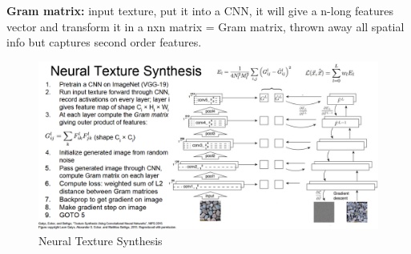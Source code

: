 \documentclass[11pt]{article}
\begin{document}
\textbf{Gram matrix:} input texture, put it into a CNN, it will give a n-long features vector and transform it in a nxn matrix = Gram matrix, thrown away all spatial info but captures second order features.
\begin{figure}[h]
\centering
\captionsetup{justification=centering}
\includegraphics[width=0.85\linewidth]{L1116.pdf}
\caption{ Neural Texture Synthesis}
\label{fig:L1116}
\end{figure}
\clearpage
\end{document}
